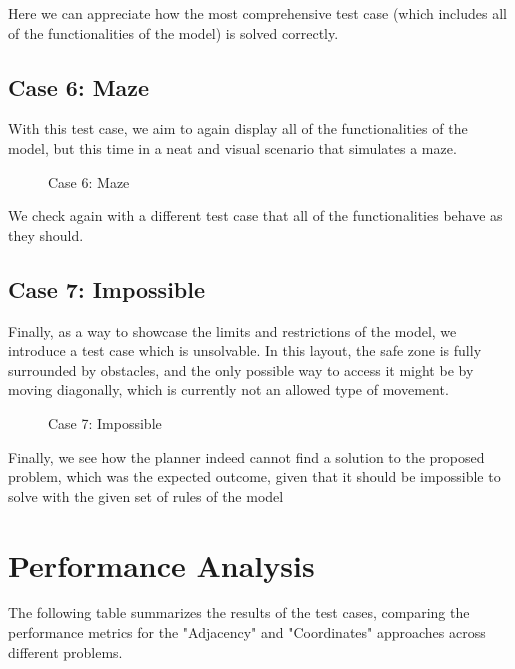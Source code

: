 \documentclass{article}
\begin{document}
Here we can appreciate how the most comprehensive test case (which includes all of the functionalities of the model) is solved correctly.

\subsection{Case 6: Maze}

With this test case, we aim to again display all of the functionalities of the model, but this time in a neat and visual scenario that simulates a maze.

\begin{figure}[ht]
    \centering
    \caption{Case 6: Maze}
    \label{fig:initial-state-maze}
\end{figure}
\FloatBarrier

We check again with a different test case that all of the functionalities behave as they should.

\subsection{Case 7: Impossible}

Finally, as a way to showcase the limits and restrictions of the model, we introduce a test case which is unsolvable. In this layout, the safe zone is fully surrounded by obstacles, and the only possible way to access it might be by moving diagonally, which is currently not an allowed type of movement.

\begin{figure}[H]
    \centering
    \caption{Case 7: Impossible}
    \label{fig:initial-state-impossible}
\end{figure}
\FloatBarrier

Finally, we see how the planner indeed cannot find a solution to the proposed problem, which was the expected outcome, given that it should be impossible to solve with the given set of rules of the model

\section{Performance Analysis}

The following table summarizes the results of the test cases, comparing the performance metrics for the "Adjacency" and "Coordinates" approaches across different problems.
\end{document}
